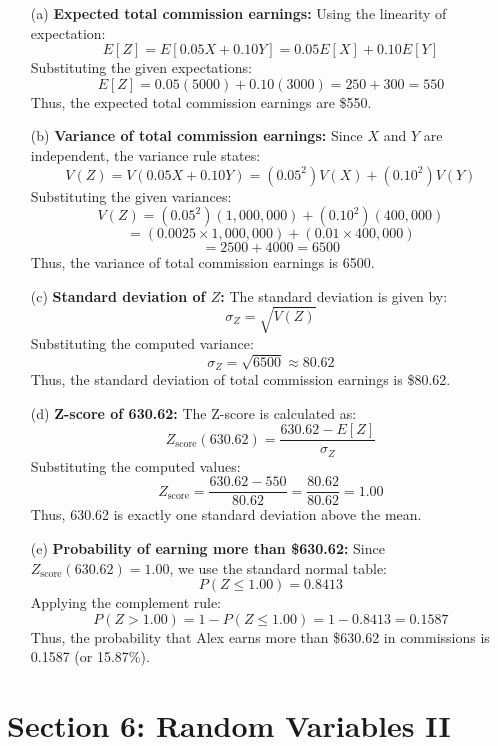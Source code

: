 \documentclass{article}
\begin{document}
\begin{enumerate}

    \item[(a)] \textbf{Expected total commission earnings:}  
    Using the linearity of expectation:
    \[
    E[Z] = E[0.05X + 0.10Y] = 0.05E[X] + 0.10E[Y]
    \]
    Substituting the given expectations:
    \[
    E[Z] = 0.05(5000) + 0.10(3000) = 250 + 300 = 550
    \]
    Thus, the expected total commission earnings are \$550.

    \item[(b)] \textbf{Variance of total commission earnings:}  
    Since \( X \) and \( Y \) are independent, the variance rule states:
    \[
    V(Z) = V(0.05X + 0.10Y) = (0.05^2)V(X) + (0.10^2)V(Y)
    \]
    Substituting the given variances:
    \[
    V(Z) = (0.05^2)(1,000,000) + (0.10^2)(400,000)
    \]
    \[
    = (0.0025 \times 1,000,000) + (0.01 \times 400,000)
    \]
    \[
    = 2500 + 4000 = 6500
    \]
    Thus, the variance of total commission earnings is 6500.

    \item[(c)] \textbf{Standard deviation of \( Z \):}  
    The standard deviation is given by:
    \[
    \sigma_Z = \sqrt{V(Z)}
    \]
    Substituting the computed variance:
    \[
    \sigma_Z = \sqrt{6500} \approx 80.62
    \]
    Thus, the standard deviation of total commission earnings is \$80.62.

    \item[(d)] \textbf{Z-score of 630.62:}  
    The Z-score is calculated as:
    \[
    Z_{\text{score}}(630.62) = \frac{630.62 - E[Z]}{\sigma_Z}
    \]
    Substituting the computed values:
    \[
    Z_{\text{score}} = \frac{630.62 - 550}{80.62} = \frac{80.62}{80.62} = 1.00
    \]
    Thus, 630.62 is exactly one standard deviation above the mean.

    \item[(e)] \textbf{Probability of earning more than \$630.62:}  
    Since \( Z_{\text{score}}(630.62) = 1.00 \), we use the standard normal table:
    \[
    P(Z \leq 1.00) = 0.8413
    \]
    Applying the complement rule:
    \[
    P(Z > 1.00) = 1 - P(Z \leq 1.00) = 1 - 0.8413 = 0.1587
    \]
    Thus, the probability that Alex earns more than \$630.62 in commissions is 0.1587 (or 15.87\%).

\end{enumerate}

\section*{Section 6: Random Variables II}
\end{document}
